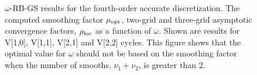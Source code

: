 \documentclass{article}
\begin{document}
{
\renewcommand{\figWidth}{6.cm}
\newcommand{\trimfig}[2]{\trimhb{#1}{#2}{.0}{.0}{.0}{.0}}
\begin{figure}[hbt]
\begin{center}
\end{center}
\caption{$\omega$-RB-GS results for the fourth-order accurate discretization.
The computed smoothing factor $\mu_{\rm opt}$, two-grid and three-grid asymptotic convergence factors,
$\rho_{\rm loc}$ as a function of $\omega$. Shown are results for V[1,0], V[1,1], V[2,1] and V[2,2] cycles.
This figure shows that the optimal value for $\omega$ should not be based on the smoothing factor
when the number of smooths, $\nu_1+\nu_2$, is greater than 2. }
\label{fig:redBlackLFA4}
\end{figure}
}



\end{document}
